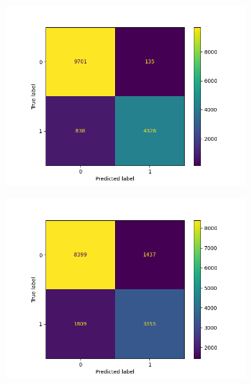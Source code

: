 \begin{figure}
    \vspace{-1cm}
        \centering
        \hspace{-2cm}
        \begin{subfigure}[b]{0.245\textwidth}
            \centering
            \includegraphics[scale=0.35]{"../figs/fig_content_title/fig_TFIDF_LogisticRegression(solver='sag')__content_title.png"}
            \caption{}
        \end{subfigure}
        \begin{subfigure}[b]{0.245\textwidth}
            \centering
            \includegraphics[scale=0.35]{"../figs/fig_content_title/fig_KNN_1_content_title.png"}

\end{subfigure}
\end{figure}
